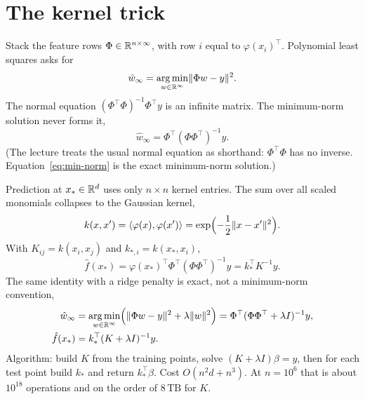 \section{The kernel trick}
\label{sec:kernel}

Stack the feature rows \(\Phi\in\mathbb{R}^{n\times\infty}\), with row \(i\) equal to \(\varphi(x_i)^\top\).
Polynomial least squares asks for
\begin{equation}
\hat w_\infty
= \operatorname*{arg\,min}_{w\in\mathbb{R}^\infty}\lVert\Phi w-y\rVert^2.
\label{eq:poly-ls}
\end{equation}
The normal equation \((\Phi^\top\Phi)^{-1}\Phi^\top y\) is an infinite matrix.
The minimum-norm solution never forms it,
\begin{equation}
\hat w_\infty = \Phi^\top(\Phi\Phi^\top)^{-1} y.
\label{eq:min-norm}
\end{equation}
(The lecture treats the usual normal equation as shorthand: \(\Phi^\top\Phi\) has no inverse. Equation~\eqref{eq:min-norm} is the exact minimum-norm solution.)

Prediction at \(x_*\in\mathbb{R}^d\) uses only \(n\times n\) kernel entries.
The sum over all scaled monomials collapses to the Gaussian kernel,
\begin{equation}
k(x,x')
= \langle\varphi(x),\varphi(x')\rangle
= \exp\Bigl(-\frac12\lVert x-x'\rVert^2\Bigr).
\label{eq:gauss}
\end{equation}
With \(K_{ij}=k(x_i,x_j)\) and \(k_{*,i}=k(x_*,x_i)\),
\begin{equation}
\hat f(x_*)
= \varphi(x_*)^\top\Phi^\top(\Phi\Phi^\top)^{-1} y
= k_*^\top K^{-1} y.
\label{eq:k-pred}
\end{equation}
The same identity with a ridge penalty is exact, not a minimum-norm convention,
\begin{align}
\hat w_\infty
&= \operatorname*{arg\,min}_{w\in\mathbb{R}^\infty}
\Bigl(\lVert\Phi w-y\rVert^2+\lambda\lVert w\rVert^2\Bigr)
= \Phi^\top(\Phi\Phi^\top+\lambda I)^{-1} y,
\label{eq:k-ridge-w}\\
\hat f(x_*)
&= k_*^\top (K+\lambda I)^{-1} y.
\label{eq:k-ridge}
\end{align}
Algorithm: build \(K\) from the training points, solve \((K+\lambda I)\beta=y\), then for each test point build \(k_*\) and return \(k_*^\top\beta\).
Cost \(O(n^2 d+n^3)\). At \(n=10^6\) that is about \(10^{18}\) operations and on the order of \(8\,\mathrm{TB}\) for \(K\).
